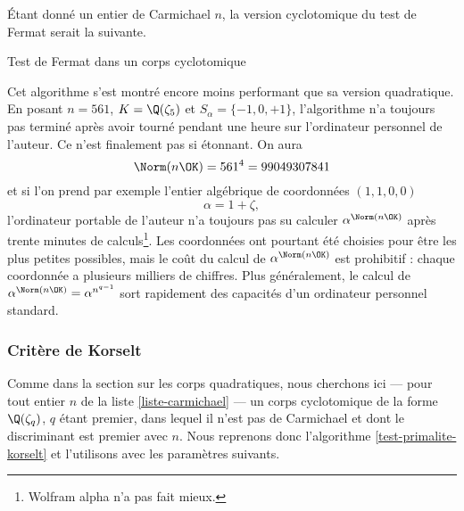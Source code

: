 Étant donné un entier de Carmichael $n$, la version \og cyclotomique \fg{} du test de Fermat serait la suivante.

\vspace{1em}
\begin{algorithm}[H]\label{test-Fermat-cyclotomique}
\caption{Test de Fermat dans un corps cyclotomique}
\end{algorithm}
\vspace{1em}

Cet algorithme s'est montré encore moins performant que sa version quadratique. En posant $n=561$, $K = \Q(\zeta_5)$ et $S_\alpha = \{-1, 0, +1\}$, l'algorithme n'a toujours pas terminé après avoir tourné pendant une heure sur l'ordinateur personnel de l'auteur. Ce n'est finalement pas si étonnant. On aura \[\Norm(n\OK) = 561^4 = 99049307841\] et si l'on prend par exemple l'entier algébrique de coordonnées $(1, 1, 0, 0)$ \[\alpha =1 + \zeta,\] l'ordinateur portable de l'auteur n'a toujours pas su calculer $\alpha^{\Norm(n\OK)}$ après trente minutes de calculs\footnote{Wolfram alpha n'a pas fait mieux.}. Les coordonnées ont pourtant été choisies pour être les plus petites possibles, mais le coût du calcul de $\alpha^{\Norm(n\OK)}$ est prohibitif : chaque coordonnée a plusieurs milliers de chiffres. Plus généralement, le calcul de $\alpha^{\Norm(n\OK)} = \alpha^{n^{q-1}}$ sort rapidement des capacités d'un ordinateur personnel standard.

\subsubsection{Critère de Korselt}

Comme dans la section sur les corps quadratiques, nous cherchons ici — pour tout entier $n$ de la liste \ref{liste-carmichael} — un corps cyclotomique de la forme $\Q(\zeta_q)$, $q$ étant premier, dans lequel il n'est pas de Carmichael et dont le discriminant est premier avec $n$. Nous reprenons donc l'algorithme \ref{test-primalite-korselt} et l'utilisons avec les paramètres suivants.

